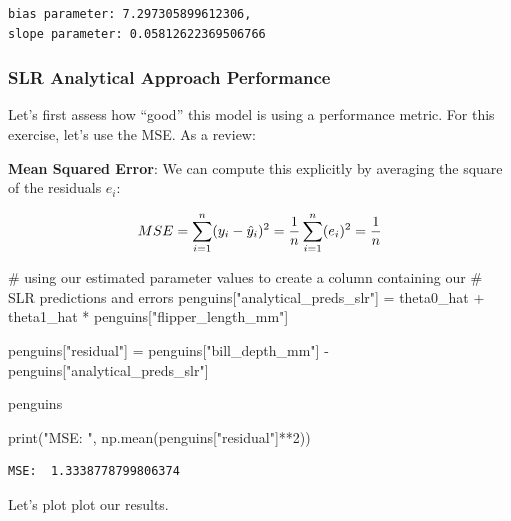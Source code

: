 \documentclass[
  letterpaper,
  DIV=11,
  numbers=noendperiod]{scrreprt}
\newenvironment{Shaded}{\begin{snugshade}}{\end{snugshade}}
\newcommand{\BuiltInTok}[1]{\textcolor[rgb]{0.00,0.23,0.31}{#1}}
\newcommand{\CommentTok}[1]{\textcolor[rgb]{0.37,0.37,0.37}{#1}}
\newcommand{\DecValTok}[1]{\textcolor[rgb]{0.68,0.00,0.00}{#1}}
\newcommand{\NormalTok}[1]{\textcolor[rgb]{0.00,0.23,0.31}{#1}}
\newcommand{\OperatorTok}[1]{\textcolor[rgb]{0.37,0.37,0.37}{#1}}
\newcommand{\StringTok}[1]{\textcolor[rgb]{0.13,0.47,0.30}{#1}}
\begin{document}
\begin{verbatim}
bias parameter: 7.297305899612306, 
slope parameter: 0.05812622369506766
\end{verbatim}

\hypertarget{slr-analytical-approach-performance}{%
\subsubsection{SLR Analytical Approach
Performance}\label{slr-analytical-approach-performance}}

Let's first assess how ``good'' this model is using a performance
metric. For this exercise, let's use the MSE. As a review:

\textbf{Mean Squared Error}: We can compute this explicitly by averaging
the square of the residuals \(e_i\):

\[\large MSE  = \sum_{i=1}^n (y_i - \hat{y}_i)^2 = \frac{1}{n}\sum_{i=1}^n (e_i)^2 = \frac{1}{n}\]

\begin{Shaded}
\begin{Highlighting}[]
\CommentTok{\# using our estimated parameter values to create a column containing our }
\CommentTok{\# SLR predictions and errors}
\NormalTok{penguins[}\StringTok{"analytical\_preds\_slr"}\NormalTok{] }\OperatorTok{=}\NormalTok{ theta0\_hat }\OperatorTok{+}\NormalTok{ theta1\_hat }\OperatorTok{*}\NormalTok{ penguins[}\StringTok{"flipper\_length\_mm"}\NormalTok{]}

\NormalTok{penguins[}\StringTok{"residual"}\NormalTok{] }\OperatorTok{=}\NormalTok{ penguins[}\StringTok{"bill\_depth\_mm"}\NormalTok{] }\OperatorTok{{-}}\NormalTok{ penguins[}\StringTok{"analytical\_preds\_slr"}\NormalTok{]}
                                          
\NormalTok{penguins}

\BuiltInTok{print}\NormalTok{(}\StringTok{"MSE: "}\NormalTok{, np.mean(penguins[}\StringTok{"residual"}\NormalTok{]}\OperatorTok{**}\DecValTok{2}\NormalTok{))}
\end{Highlighting}
\end{Shaded}

\begin{verbatim}
MSE:  1.3338778799806374
\end{verbatim}

Let's plot plot our results.
\end{document}
